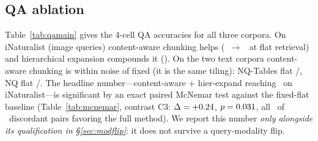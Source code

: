 \documentclass[11pt]{article}
\begin{document}
\begin{table}[t]\centering
  \caption{Retrieval per corpus and query modality. Content-aware chunking is neutral on the text
  corpora (identical tiles); on iNaturalist it raises image-query recall but lowers text-query recall.}
  \label{tab:retrieval}
  
\end{table}

\subsection{QA ablation}\label{sec:qa}
Table~\ref{tab:qamain} gives the 4-cell QA accuracies for all three corpora. On iNaturalist (image
queries) content-aware chunking helps (\InatFixedFlatAcc\ $\to$ \InatCaFlatAcc\ at flat retrieval) and
hierarchical expansion compounds it (\InatCaHierAcc). On the two text corpora content-aware chunking is within noise of fixed
(it is the same tiling): NQ-Tables flat \NqtFixedFlatAcc/\NqtCaFlatAcc, NQ flat
\NqFixedFlatAcc/\NqCaFlatAcc. The headline number---content-aware $+$ hier-expand reaching
\InatCaHierAcc\ on iNaturalist---is significant by an exact paired McNemar test against the fixed-flat
baseline (Table~\ref{tab:mcnemar}, contrast \textsc{C3}: $\Delta=+0.24$, $p=0.031$, all
\McNemarFavor\ of \McNemarDiscordant\ discordant pairs favoring the full method). We report this number
\emph{only alongside its qualification in \S\ref{sec:modflip}}: it does not survive a query-modality flip.

\begin{table}[t]\centering
  \caption{QA accuracy, 4-cell ablation per corpus. Content-aware chunking helps only on iNaturalist
  (image queries); on the text corpora it is within noise (identical tiling). \textbf{Bold} is the
  iNaturalist headline, qualified in \S\ref{sec:modflip}.}
  \label{tab:qamain}
  
\end{table}

\begin{table}[t]\centering
  \caption{Exact paired McNemar tests on the iNaturalist image-query 4 cells ($n=\McNemarN$).
  $^\star$ denotes $p<0.05$. The significant best-vs-baseline gain (\textsc{C3}) is qualified by
  \S\ref{sec:modflip}.}
  \label{tab:mcnemar}
  
\end{table}
\end{document}
